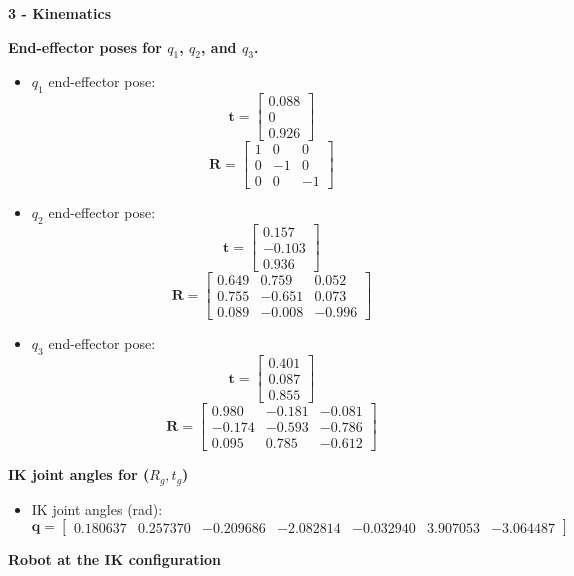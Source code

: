 \documentclass[10pt,letterpaper]{article}
\begin{document}
\newpage
\large \textbf{3 - Kinematics}

\vspace{0.1in}
\textbf{End-effector poses for \(q_1\), \(q_2\), and \(q_3\).}
\begin{itemize}
  \item \(q_1\) end-effector pose:\\
  \hspace{0.1in} 
  $$ \textbf{t} = \begin{bmatrix}
    0.088 \\
    0 \\
    0.926
  \end{bmatrix}
  $$
  $$ \textbf{R} = \begin{bmatrix}
    1 & 0 & 0 \\
    0 & -1 & 0 \\
    0 & 0 & -1
  \end{bmatrix}
  $$
  \item \(q_2\) end-effector pose:\\
  \hspace{0.1in} 
  $$ \textbf{t} = \begin{bmatrix}
    0.157 \\
    -0.103 \\
    0.936
  \end{bmatrix}
  $$
  $$ \textbf{R} = \begin{bmatrix}
    0.649 & 0.759 & 0.052 \\
    0.755 & -0.651 & 0.073 \\
    0.089 & -0.008 & -0.996
  \end{bmatrix}
  $$
  \item \(q_3\) end-effector pose:\\
  \hspace{0.1in} 
  $$ \textbf{t} = \begin{bmatrix}
    0.401 \\
    0.087 \\
    0.855
  \end{bmatrix}
  $$
  $$ \textbf{R} = \begin{bmatrix}
    0.980 & -0.181 & -0.081 \\
    -0.174 & -0.593 & -0.786 \\
    0.095 & 0.785 & -0.612
  \end{bmatrix}
  $$
\end{itemize}
\textbf{IK joint angles for (\(R_g, t_g\))}
\begin{itemize}
  \item IK joint angles (rad):\\
  $$ \textbf{q} = \begin{bmatrix}
    0.180637 & 0.257370 & -0.209686 & -2.082814 & -0.032940 & 3.907053 & -3.064487
    \end{bmatrix} 
    $$
\end{itemize}
\textbf{Robot at the IK configuration}
\end{document}
